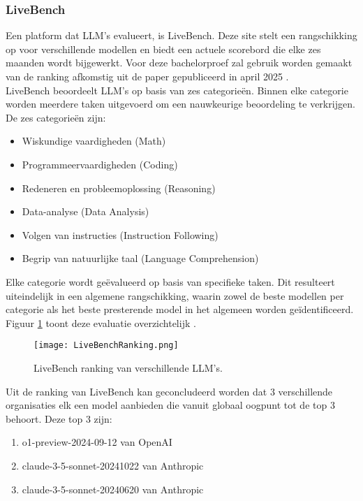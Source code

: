 \subsubsection{LiveBench} 
Een platform dat LLM's evalueert, is LiveBench. Deze site stelt een rangschikking op voor verschillende modellen en biedt een actuele scorebord die elke zes maanden wordt bijgewerkt. Voor deze bachelorproef zal gebruik worden gemaakt van de ranking afkomstig uit de paper gepubliceerd in april 2025 \autocite{livebench}.
\\[1em]
LiveBench beoordeelt LLM's op basis van zes categorieën. Binnen elke categorie worden meerdere taken uitgevoerd om een nauwkeurige beoordeling te verkrijgen. De zes categorieën zijn:
\begin{itemize}
    \item Wiskundige vaardigheden (Math)
    \item Programmeervaardigheden (Coding)
    \item Redeneren en probleemoplossing (Reasoning)
    \item Data-analyse (Data Analysis)
    \item Volgen van instructies (Instruction Following)
    \item Begrip van natuurlijke taal (Language Comprehension)
\end{itemize}

Elke categorie wordt geëvalueerd op basis van specifieke taken. Dit resulteert uiteindelijk in een algemene rangschikking, waarin zowel de beste modellen per categorie als het beste presterende model in het algemeen worden geïdentificeerd. Figuur \ref{fig:livebench} toont deze evaluatie overzichtelijk \autocite{livebench}.

\begin{figure}[H]
    \centering
    \texttt{[image: LiveBenchRanking.png]}
    \caption{LiveBench ranking van verschillende LLM's.}
    \label{fig:livebench}
\end{figure}

Uit de ranking van LiveBench kan geconcludeerd worden dat 3 verschillende organisaties elk een model aanbieden die vanuit globaal oogpunt tot de top 3 behoort. Deze top 3 zijn: 
\begin{enumerate}
    \item o1-preview-2024-09-12 van OpenAI
    \item claude-3-5-sonnet-20241022 van Anthropic
    \item claude-3-5-sonnet-20240620 van Anthropic
\end{enumerate}

